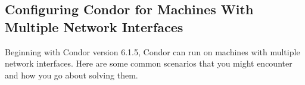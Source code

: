 \subsection{\label{sec:Multiple-Interfaces}Configuring Condor for
Machines With Multiple Network Interfaces } 


%
%
%
%

Beginning with Condor version 6.1.5, Condor can run on machines with
multiple network interfaces. Here are some common scenarios that you might
encounter and how you go about solving them.


